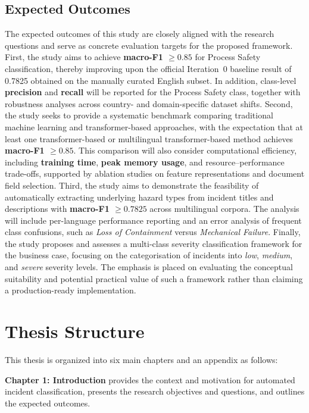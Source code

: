 \documentclass[11pt, titlepage, bibliography=totoc]{scrreprt}
\begin{document}
\subsection{Expected Outcomes}

The expected outcomes of this study are closely aligned with the research questions and serve as concrete evaluation targets for the proposed framework. First, the study aims to achieve \textbf{macro-F1 $\geq 0.85$} for Process Safety classification, thereby improving upon the official Iteration~0 baseline result of 0.7825 obtained on the manually curated English subset. In addition, class-level \textbf{precision} and \textbf{recall} will be reported for the Process Safety class, together with robustness analyses across country- and domain-specific dataset shifts. Second, the study seeks to provide a systematic benchmark comparing traditional machine learning and transformer-based approaches, with the expectation that at least one transformer-based or multilingual transformer-based method achieves \textbf{macro-F1 $\geq 0.85$}. This comparison will also consider computational efficiency, including \textbf{training time}, \textbf{peak memory usage}, and resource--performance trade-offs, supported by ablation studies on feature representations and document field selection. Third, the study aims to demonstrate the feasibility of automatically extracting underlying hazard types from incident titles and descriptions with \textbf{macro-F1 $\geq 0.7825$} across multilingual corpora. The analysis will include per-language performance reporting and an error analysis of frequent class confusions, such as \textit{Loss of Containment} versus \textit{Mechanical Failure}. Finally, the study proposes and assesses a multi-class severity classification framework for the business case, focusing on the categorisation of incidents into \textit{low}, \textit{medium}, and \textit{severe} severity levels. The emphasis is placed on evaluating the conceptual suitability and potential practical value of such a framework rather than claiming a production-ready implementation.

\newpage

\section{Thesis Structure}

This thesis is organized into six main chapters and an appendix as follows:

\textbf{Chapter 1: Introduction} provides the context and motivation for automated incident classification, presents the research objectives and questions, and outlines the expected outcomes.
\end{document}
